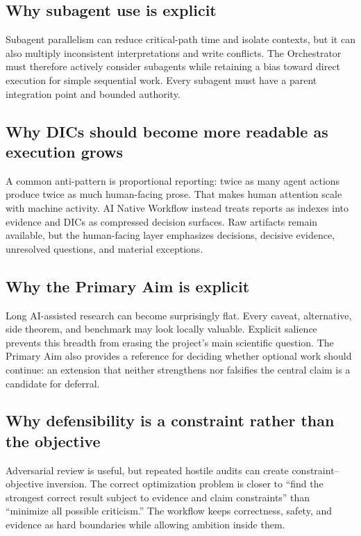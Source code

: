 \documentclass[11pt,a4paper]{article}
\begin{document}
\subsection{Why subagent use is explicit}
Subagent parallelism can reduce critical-path time and isolate contexts, but it can also multiply inconsistent interpretations and write conflicts. The Orchestrator must therefore actively consider subagents while retaining a bias toward direct execution for simple sequential work. Every subagent must have a parent integration point and bounded authority.

\subsection{Why DICs should become more readable as execution grows}
A common anti-pattern is proportional reporting: twice as many agent actions produce twice as much human-facing prose. That makes human attention scale with machine activity. AI Native Workflow instead treats reports as indexes into evidence and DICs as compressed decision surfaces. Raw artifacts remain available, but the human-facing layer emphasizes decisions, decisive evidence, unresolved questions, and material exceptions.

\subsection{Why the Primary Aim is explicit}
Long AI-assisted research can become surprisingly flat. Every caveat, alternative, side theorem, and benchmark may look locally valuable. Explicit salience prevents this breadth from erasing the project's main scientific question. The Primary Aim also provides a reference for deciding whether optional work should continue: an extension that neither strengthens nor falsifies the central claim is a candidate for deferral.

\subsection{Why defensibility is a constraint rather than the objective}
Adversarial review is useful, but repeated hostile audits can create constraint--objective inversion. The correct optimization problem is closer to ``find the strongest correct result subject to evidence and claim constraints'' than ``minimize all possible criticism.'' The workflow keeps correctness, safety, and evidence as hard boundaries while allowing ambition inside them.
\end{document}

